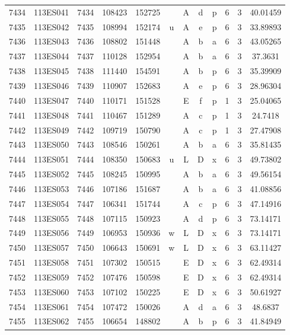\begin{tabular}{|*{12}{c|}}
7434 & 113ES041 & 7434 & 108423 & 152725 &  & A & d & p & 6 & 3 & 40.01459 \\ 
7435 & 113ES042 & 7435 & 108994 & 152174 & u & A & e & p & 6 & 3 & 33.89893 \\ 
7436 & 113ES043 & 7436 & 108802 & 151448 &  & A & b & a & 6 & 3 & 43.05265 \\ 
7437 & 113ES044 & 7437 & 110128 & 152954 &  & A & b & a & 6 & 3 & 37.3631 \\ 
7438 & 113ES045 & 7438 & 111440 & 154591 &  & A & b & p & 6 & 3 & 35.39909 \\ 
7439 & 113ES046 & 7439 & 110907 & 152683 &  & A & e & p & 6 & 3 & 28.96304 \\ 
7440 & 113ES047 & 7440 & 110171 & 151528 &  & E & f & p & 1 & 3 & 25.04065 \\ 
7441 & 113ES048 & 7441 & 110467 & 151289 &  & A & c & p & 1 & 3 & 24.7418 \\ 
7442 & 113ES049 & 7442 & 109719 & 150790 &  & A & c & p & 1 & 3 & 27.47908 \\ 
7443 & 113ES050 & 7443 & 108546 & 150261 &  & A & b & a & 6 & 3 & 35.81435 \\ 
7444 & 113ES051 & 7444 & 108350 & 150683 & u & L & D & x & 6 & 3 & 49.73802 \\ 
7445 & 113ES052 & 7445 & 108245 & 150995 &  & A & b & a & 6 & 3 & 49.56154 \\ 
7446 & 113ES053 & 7446 & 107186 & 151687 &  & A & b & a & 6 & 3 & 41.08856 \\ 
7447 & 113ES054 & 7447 & 106341 & 151744 &  & A & c & p & 6 & 3 & 47.14916 \\ 
7448 & 113ES055 & 7448 & 107115 & 150923 &  & A & d & p & 6 & 3 & 73.14171 \\ 
7449 & 113ES056 & 7449 & 106953 & 150936 & w & L & D & x & 6 & 3 & 73.14171 \\ 
7450 & 113ES057 & 7450 & 106643 & 150691 & w & L & D & x & 6 & 3 & 63.11427 \\ 
7451 & 113ES058 & 7451 & 107302 & 150515 &  & E & D & x & 6 & 3 & 62.49314 \\ 
7452 & 113ES059 & 7452 & 107476 & 150598 &  & E & D & x & 6 & 3 & 62.49314 \\ 
7453 & 113ES060 & 7453 & 107102 & 150225 &  & E & D & x & 6 & 3 & 50.61927 \\ 
7454 & 113ES061 & 7454 & 107472 & 150026 &  & A & d & a & 6 & 3 & 48.6837 \\ 
7455 & 113ES062 & 7455 & 106654 & 148802 &  & A & b & p & 6 & 3 & 41.84949 \\ 

\end{tabular}
